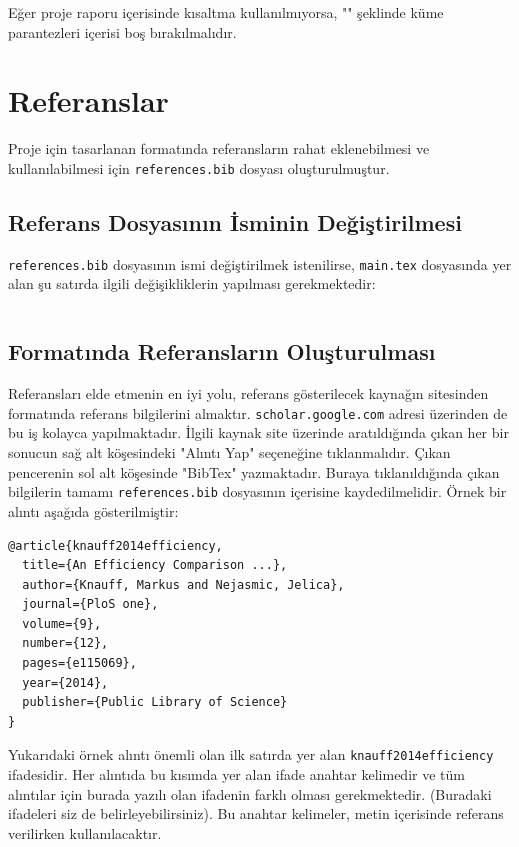 Eğer proje raporu içerisinde kısaltma kullanılmıyorsa, "\texttt{\def\abbrevations{}}" şeklinde küme parantezleri içerisi boş bırakılmalıdır.

\section{Referanslar}
Proje için tasarlanan \latex formatında referansların rahat eklenebilmesi ve kullanılabilmesi için \texttt{references.bib} dosyası oluşturulmuştur.

\subsection{Referans Dosyasının İsminin Değiştirilmesi}
\texttt{references.bib} dosyasının ismi değiştirilmek istenilirse, \texttt{main.tex} dosyasında yer alan şu satırda ilgili değişikliklerin yapılması gerekmektedir:

\begin{verbatim}

\end{verbatim}

\subsection{\latex Formatında Referansların Oluşturulması}
Referansları elde etmenin en iyi yolu, referans gösterilecek kaynağın sitesinden \latex formatında referans bilgilerini almaktır. \texttt{scholar.google.com} adresi üzerinden de bu iş kolayca yapılmaktadır. İlgili kaynak site üzerinde aratıldığında çıkan her bir sonucun sağ alt köşesindeki "Alıntı Yap" seçeneğine tıklanmalıdır. Çıkan pencerenin sol alt köşesinde "BibTex" yazmaktadır. Buraya tıklanıldığında çıkan bilgilerin tamamı \texttt{references.bib} dosyasının içerisine  kaydedilmelidir. Örnek bir alıntı aşağıda gösterilmiştir:

\begin{verbatim}
@article{knauff2014efficiency,
  title={An Efficiency Comparison ...},
  author={Knauff, Markus and Nejasmic, Jelica},
  journal={PloS one},
  volume={9},
  number={12},
  pages={e115069},
  year={2014},
  publisher={Public Library of Science}
}
\end{verbatim}

Yukarıdaki örnek alıntı önemli olan ilk satırda yer alan \texttt{knauff2014efficiency} ifadesidir. Her alıntıda bu kısımda yer alan ifade anahtar kelimedir ve tüm alıntılar için burada yazılı olan ifadenin farklı olması gerekmektedir. (Buradaki ifadeleri siz de belirleyebilirsiniz). Bu anahtar kelimeler, metin içerisinde referans verilirken kullanılacaktır.

